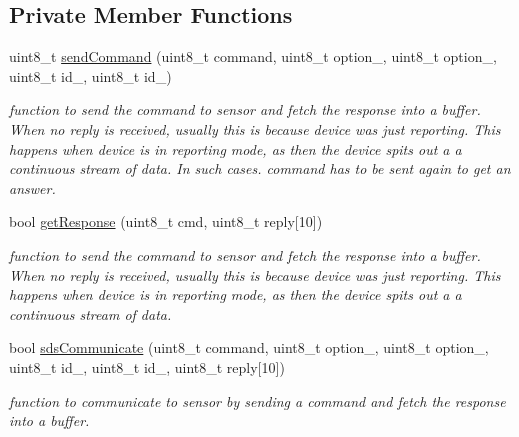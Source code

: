 \subsection*{Private Member Functions}
\begin{DoxyCompactItemize}
\item 
uint8\+\_\+t \mbox{\hyperlink{classsds011_aff3c41586a6f4ac084edfb0da0f05c40}{send\+Command}} (uint8\+\_\+t command, uint8\+\_\+t option\+\_, uint8\+\_\+t option\+\_, uint8\+\_\+t id\+\_, uint8\+\_\+t id\+\_)
\begin{DoxyCompactList}\small\item\em function to send the command to sensor and fetch the response into a buffer. When no reply is received, usually this is because device was just reporting. This happens when device is in reporting mode, as then the device spits out a a continuous stream of data. In such cases. command has to be sent again to get an answer. \end{DoxyCompactList}\item 
bool \mbox{\hyperlink{classsds011_a8ff0bda35ce371348033b9c2983b8999}{get\+Response}} (uint8\+\_\+t cmd, uint8\+\_\+t reply\mbox{[}10\mbox{]})
\begin{DoxyCompactList}\small\item\em function to send the command to sensor and fetch the response into a buffer. When no reply is received, usually this is because device was just reporting. This happens when device is in reporting mode, as then the device spits out a a continuous stream of data. \end{DoxyCompactList}\item 
bool \mbox{\hyperlink{classsds011_a2b0c11ba7bef6a0cc7812ced5bb31d60}{sds\+Communicate}} (uint8\+\_\+t command, uint8\+\_\+t option\+\_, uint8\+\_\+t option\+\_, uint8\+\_\+t id\+\_, uint8\+\_\+t id\+\_, uint8\+\_\+t reply\mbox{[}10\mbox{]})
\begin{DoxyCompactList}\small\item\em function to communicate to sensor by sending a command and fetch the response into a buffer. \end{DoxyCompactList}\end{DoxyCompactItemize}
